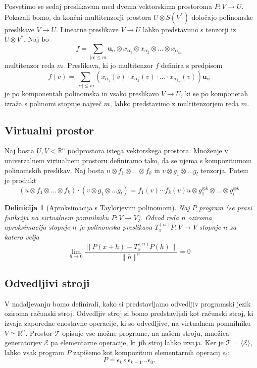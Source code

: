 \documentclass{article}
\newcommand{\RR}{\mathbb{R}}
\newcommand{\E}{\mathcal{E}}
\newcommand{\T}{\mathcal{T}}
\newcommand{\uu}{\mathbf{u}}
\newtheorem{definicija}{Definicija}[section]
\begin{document}
Posvetimo se sedaj preslikavam med dvema vektorskima prostoroma $P:V\to U$.
Pokazali bomo, da končni multitenzorji prostora $U\otimes S(V^*)$ določajo
polinomske preslikave $V\to U$. Linearne preslikave $V\to U$ lahko predstavimo s
tenzorji iz $U\otimes V^*$. Naj bo 
$$f=\sum_{|\alpha|\le m}\uu_\alpha\otimes x_{\alpha_1}\otimes x_{\alpha_2}\otimes
\ldots \otimes x_{\alpha_{k_\alpha}}$$ multitenzor reda $m$. Preslikava, ki jo
multitenzor $f$ definira s predpisom 
$$f(v) = \sum_{|\alpha|\le m}\left( x_{\alpha_1}(v)\cdot x_{\alpha_2}(v)\cdot
\ldots \cdot x_{\alpha_{k_\alpha}}(v) \right)\uu_\alpha$$
je po komponentah polinomska in vsako preslikavo $V\to U$, ki se po komponetah izraža s
polinomi stopnje največ $m$, lahko predstavimo z multitenzorjem reda $m$.
  
\subsection{Virtualni prostor}

Naj bosta $U, V < \RR^n$ podprostora istega vektorskega prostora. Množenje v
univerzalnem virtualnem prostoru definiramo tako, da se ujema s kompozitumom
polinomskih preslikav. Naj bosta $u\otimes f_1\otimes\ldots \otimes f_k$ in
$v\otimes g_1\otimes \ldots g_l$ tenzorja. Potem je produkt
\begin{equation}
  \label{eq:produkt}
 \left( u\otimes f_1\otimes\ldots \otimes f_k \right)\cdot \left(v\otimes g_1\otimes \ldots g_l\right) = f_1(v)\cdots f_k(v) u\otimes g_1^{\otimes k}\otimes \ldots \otimes g_l^{\otimes k}
\end{equation}

\begin{definicija}[Aproksimacija s Taylorjevim polinomom]
Naj $P$ program (se pravi funkcija na virtualnem pomnilniku $P:V\to V$). Odvod
reda $n$ oziroma aproksimacija stopnje $n$ je polinomska preslikava
$T^{(n)}_xP:V\to V$ stopnje $n$ za katero velja
\begin{equation}
  \label{eq:aprox}
  \lim_{h\to 0}\frac{\|P(x+h)-T^{(n)}_xP(h)\|}{\|h\|^n}=0
\end{equation}
\end{definicija}

\subsection{Odvedljivi stroji}
V nadaljevanju bomo definirali, kako si predstavljamo odvedljiv programski jezik
oziroma računski stroj. Odvedljiv stroj si bomo predstavljali kot računski
stroj, ki izvaja zaporedne enostavne operacije, ki so odvedljive, na virtualnem
pomnilniku $V\simeq\RR^n$. Prostor $\T$ opisuje vse možne programe, na našem
stroju, množica generatorjev $\E$ pa elementarne operacije, ki jih stroj lahko
izvaja. Ker je $\T=\langle \E \rangle$, lahko vsak program $P$ zapišemo kot
kompozitum elementarnih operacij $\epsilon_i$:
\[
P = \epsilon_k\circ\epsilon_{k-1}\ldots\epsilon_0.
\]  
\end{document}
